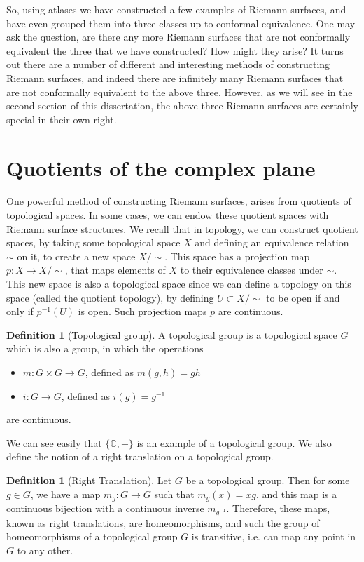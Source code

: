 \documentclass[11pt]{report}
\theoremstyle{definition}
\newtheorem{defn}[thm]{Definition}
\begin{document}
So, using atlases we have constructed a few examples of Riemann surfaces, and have even grouped them into three classes up to conformal equivalence.
One may ask the question, are there any more Riemann surfaces that are not conformally equivalent the three that we have constructed? How might they arise? It turns out there are a number of different and interesting methods of constructing Riemann surfaces, and indeed there are infinitely many Riemann surfaces that are not conformally equivalent to the above three. However, as we will see in the second section of this dissertation, the above three Riemann surfaces are certainly special in their own right.

\section{Quotients of the complex plane}\label{QuotientSection}
One powerful method of constructing Riemann surfaces, arises from quotients of topological spaces. In some cases, we can endow these quotient spaces with Riemann surface structures. We recall that in topology, we can construct quotient spaces, by taking some topological space $X$ and defining an equivalence relation $\sim$ on it, to create a new space $X/\sim$. This space has a projection map $p \colon X \rightarrow X/\sim$, that maps elements of $X$ to their equivalence classes under $\sim$. This new space is also a topological space since we can define a topology on this space (called the quotient topology), by defining $U \subset X/\sim$ to be open if and only if $p^{-1}(U)$ is open. Such projection maps $p$ are continuous. 
\begin{defn}[Topological group]
  A topological group is a topological space $G$ which is also a group, in which the operations
  \begin{itemize}
    \item $m:G \times G \rightarrow G$, defined as $m(g,h)=gh$
    \item $i:G \rightarrow G$, defined as $i(g)=g^{-1}$
  \end{itemize}
  are continuous.
\end{defn}
We can see easily that $\{\mathbb{C}, + \}$ is an example of a topological group. We also define the notion of a right translation on a topological group.
\begin{defn}[Right Translation]
  Let $G$ be a topological group. Then for some $g \in G$, we have a map $m_g:G \rightarrow G$ such that $m_g(x) = xg$, and this map is a continuous bijection with a continuous inverse $m_{g^{-1}}$. Therefore, these maps, known as right translations, are homeomorphisms, and such the group of homeomorphisms of a topological group $G$ is transitive, i.e. can map any point in $G$ to any other.
\end{defn}
\end{document}
